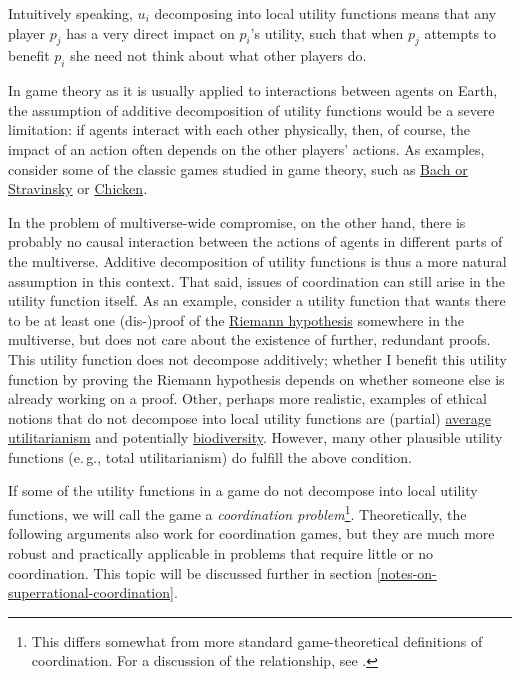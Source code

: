 Intuitively speaking, \(u_{i}\) decomposing into local utility functions
means that any player \(p_{j}\) has a very direct impact on \(p_{i}\)'s
utility, such that when \(p_{j}\) attempts to benefit \(p_{i}\) she need
not think about what other players do.

In game theory as it is usually applied to interactions between agents
on Earth, the assumption of additive decomposition of utility functions
would be a severe limitation: if agents interact with each other
physically, then, of course, the impact of an action often depends on
the other players' actions. As examples, consider some of the classic
games studied in game theory, such as
\href{https://en.wikipedia.org/wiki/Battle_of_the_sexes_(game_theory)}{Bach
or Stravinsky} or
\href{https://en.wikipedia.org/wiki/Chicken_(game)}{Chicken}.

In the problem of multiverse-wide compromise, on the other hand, there
is probably no causal interaction between the actions of agents in
different parts of the multiverse. Additive decomposition of utility
functions is thus a more natural assumption in this context. That said,
issues of coordination can still arise in the utility function itself.
As an example, consider a utility function that wants there to be at
least one (dis-)proof of the
\href{https://en.wikipedia.org/wiki/Riemann_hypothesis}{Riemann
hypothesis} somewhere in the multiverse, but does not care about the
existence of further, redundant proofs. This utility function does not
decompose additively; whether I benefit this utility function by proving
the Riemann hypothesis depends on whether someone else is already
working on a proof. Other, perhaps more realistic, examples of ethical
notions that do not decompose into local utility functions are (partial)
\href{https://en.wikipedia.org/wiki/Average_and_total_utilitarianism}{average
utilitarianism} and potentially
\href{https://en.wikipedia.org/wiki/Biodiversity}{biodiversity}.
However, many other plausible utility functions (e.\,g., total
utilitarianism) do fulfill the above condition.

If some of the utility functions in a game do not decompose into local
utility functions, we will call the game a \emph{coordination
problem}\footnote{This differs somewhat from more standard
  game-theoretical definitions of coordination. For a discussion of the
  relationship, see \parencite{Oesterheld2017-lt}.}.
Theoretically, the following arguments also work for coordination games,
but they are much more robust and practically applicable in problems
that require little or no coordination. This topic will be discussed
further in section
\ref{notes-on-superrational-coordination}.

